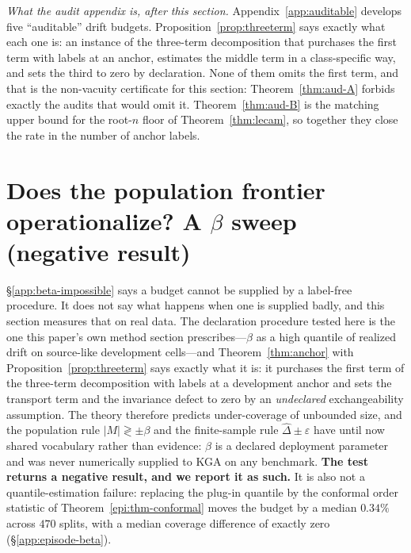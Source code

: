 \documentclass[conference]{IEEEtran}
\theoremstyle{plain}
\theoremstyle{definition}
\begin{document}
\noindent\emph{What the audit appendix is, after this section.} Appendix~\ref{app:auditable}
develops five ``auditable'' drift budgets. Proposition~\ref{prop:threeterm} says exactly what each
one is: an instance of the three-term decomposition that purchases the first term with labels at an
anchor, estimates the middle term in a class-specific way, and sets the third to zero by
declaration. None of them omits the first term, and that is the non-vacuity certificate for this
section: Theorem~\ref{thm:aud-A} forbids exactly the audits that would omit it.
Theorem~\ref{thm:aud-B} is the matching upper bound for the root-$n$ floor of
Theorem~\ref{thm:lecam}, so together they close the rate in the number of anchor labels.

\section{Does the population frontier operationalize? A $\beta$ sweep (negative
result)}\label{sec:beta-sweep}\label{sec:beta-sweep-long}
\S\ref{app:beta-impossible} says a budget cannot be supplied by a label-free procedure. It does not
say what happens when one is supplied badly, and this section measures that on real data. The
declaration procedure tested here is the one this paper's own method section prescribes---$\beta$ as
a high quantile of realized drift on source-like development cells---and
Theorem~\ref{thm:anchor} with Proposition~\ref{prop:threeterm} says exactly what it is: it
purchases the first term of the three-term decomposition with labels at a development anchor and
sets the transport term and the invariance defect to zero by an \emph{undeclared} exchangeability
assumption. The theory therefore predicts under-coverage of unbounded size, and the population rule
$|M|\gtrless\pm\beta$ and the finite-sample rule $\widehat\Delta\pm\varepsilon$ have until now
shared vocabulary rather than evidence: $\beta$ is a declared deployment parameter and was never
numerically supplied to \textsc{KGA} on any benchmark.
\textbf{The test returns a negative result, and we report it as such.} It is also not a
quantile-estimation failure: replacing the plug-in quantile by the conformal order statistic of
Theorem~\ref{epi:thm-conformal} moves the budget by a median $0.34\%$ across $470$ splits, with a
median coverage difference of exactly zero (\S\ref{app:episode-beta}).
\end{document}
